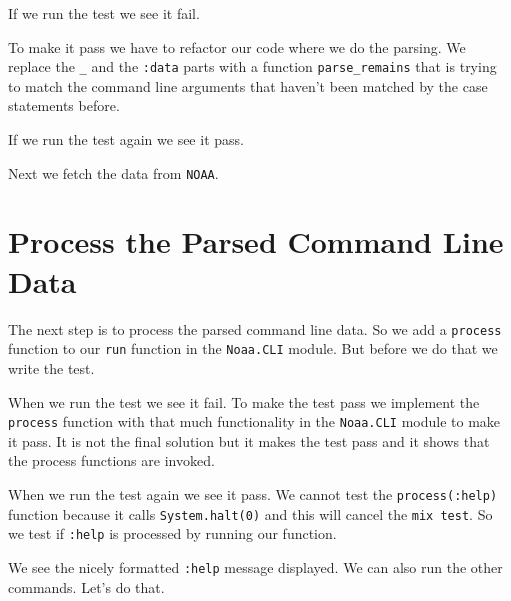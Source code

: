 \documentclass[10pt, a4paper]{article}
\newcommand{\includecode}[3]{}
\begin{document}
\includecode{test/cli\_test3.exs}{lst:clitest3}{listings/cli_test3.exs}

If we run the test we see it fail.

\includecode{mix test}{lst:testresult5}{listings/test-result4}

To make it pass we have to refactor our code where we do the parsing. We
replace the \texttt{\_} and the \texttt{:data} parts with a function
\texttt{parse\_remains} that is trying to match the command line arguments 
that haven't been matched by the case statements before. 

\includecode{lib/cli4.ex}{lst:cli4}{listings/cli4.ex}

If we run the test again we see it pass.

\includecode{mix test}{lst:testresult6}{listings/test-result5}

Next we fetch the data from \texttt{NOAA}.

\section{Process the Parsed Command Line Data}
The next step is to process the parsed command line data. So we add a 
\texttt{process} function to our \texttt{run} function in the 
\texttt{Noaa.CLI} module. But before we do that we write the test.

\includecode{test/cli\_process\_test.exs}{lst:clitest4}
            {listings/cli_process_test.exs}

When we run the test we see it fail. To make the test pass we implement the
\texttt{process} function with that much functionality in the \texttt{Noaa.CLI}
module to make it pass. It is not the final solution but it makes the test pass 
and it shows that the process functions are invoked.

\includecode{lib/noaa/cli5.ex}{lst:cli5}{listings/cli5.ex}

When we run the test again we see it pass. We cannot test the 
\texttt{process(:help)} function because it calls \texttt{System.halt(0)} and
this will cancel the \texttt{mix test}. So we test if \texttt{:help} is
processed by running our function.

\includecode{Running the function with mix}{lst:mixhelp}{listings/run-help}

We see the nicely formatted \texttt{:help} message displayed. We can also run
the other commands. Let's do that.

\includecode{Running :data with mix}{lst:mixdata}{listings/run-data}
\end{document}
